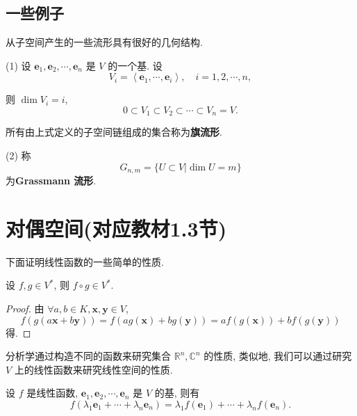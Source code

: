 \documentclass[color=black,device=normal,lang=cn,mode=geye]{elegantnote}
\begin{document}
\subsection{一些例子}
\begin{example}
    从子空间产生的一些流形具有很好的几何结构.

    (1) 设 $\boldsymbol{e}_1,\boldsymbol{e}_2,\cdots,\boldsymbol{e}_n$ 是 $V$ 的一个基. 设
    \[V_i=\left<\boldsymbol{e}_1,\cdots,\boldsymbol{e}_i\right>,\quad i=1,2,\cdots,n,\]

    则 $\dim V_i=i$,
    \[0\subset V_1\subset V_2\subset\cdots\subset V_n=V.\]
    
    所有由上式定义的子空间链组成的集合称为\textbf{旗流形}.

    (2) 称
    \[G_{n,m}=\{U\subset V|\dim U=m\}\]
    为\textbf{Grassmann 流形}.
\end{example}
\section{对偶空间(对应教材1.3节)}
下面证明线性函数的一些简单的性质.
\begin{property}\label{p2.1}
    设 $f,g\in V^*$, 则 $f\circ g\in V^*$.
\end{property}
\begin{proof}
    由 $\forall a,b\in K,\boldsymbol{x},\boldsymbol{y}\in V$,
    \[f(g(a\boldsymbol{x}+b\boldsymbol{y}))=f(ag(\boldsymbol{x})+bg(\boldsymbol{y}))=af(g(\boldsymbol{x}))+bf(g(\boldsymbol{y}))\]
    得.
\end{proof}

分析学通过构造不同的函数来研究集合 $\mathbb{R}^n,\mathbb{C}^n$ 的性质, 类似地, 我们可以通过研究 $V$ 上的线性函数来研究线性空间的性质.

设 $f$ 是线性函数, $\boldsymbol{e}_1,\boldsymbol{e}_2,\cdots,\boldsymbol{e}_n$ 是 $V$ 的基, 则有
\begin{equation}\label{eq2.1}
    f(\lambda_1\boldsymbol{e}_1+\cdots+\lambda_n\boldsymbol{e}_n)=\lambda_1f(\boldsymbol{e}_1)+\cdots+\lambda_nf(\boldsymbol{e}_n).
\end{equation}
\end{document}
